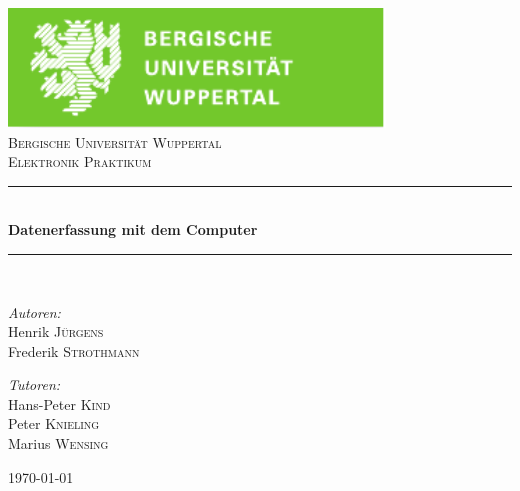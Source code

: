 \documentclass[12pt,a4paper]{article}
\begin{document}


\begin{titlepage}

\begin{center}
\includegraphics[width=0.75\textwidth]{logo.pdf}\\[1cm]    	%

\textsc{\LARGE Bergische Universität Wuppertal}\\[1.5cm]	%

\textsc{\Large Elektronik Praktikum}\\[0.5cm]				%


\newcommand{\HRule}{\rule{\linewidth}{0.5mm}}
\HRule \\[0.4cm]
{ \huge \bfseries Datenerfassung mit dem Computer}\\[0.4cm]				%

\HRule \\[1.5cm]

\begin{minipage}{0.4\textwidth}
\begin{flushleft} \large
\emph{Autoren:}\\
Henrik \textsc{Jürgens} \\
Frederik \textsc{Strothmann}
\end{flushleft}
\end{minipage}
\hfill
\begin{minipage}{0.4\textwidth}
\begin{flushright} \large
\emph{Tutoren:} \\
Hans-Peter \textsc{Kind} \\
Peter \textsc{Knieling} \\
Marius \textsc{Wensing}
\end{flushright}
\end{minipage}

\vfill

{\large \today}

\end{center}

\end{titlepage}
\end{document}
